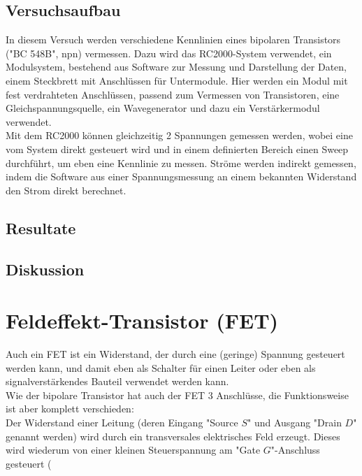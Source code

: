 \documentclass[12pt,a4paper]{article}
\begin{document}
\begin{multicols}{2}
\subsection{Versuchsaufbau}

In diesem Versuch werden verschiedene Kennlinien eines bipolaren Transistors ("BC 548B", npn) vermessen. Dazu wird das RC2000-System verwendet, ein Modulsystem, bestehend aus Software zur Messung und Darstellung der Daten, einem Steckbrett mit Anschlüssen für Untermodule. Hier werden ein Modul mit fest verdrahteten Anschlüssen, passend zum Vermessen von Transistoren, eine Gleichspannungsquelle, ein Wavegenerator und dazu ein Verstärkermodul verwendet.\\
Mit dem RC2000 können gleichzeitig 2 Spannungen gemessen werden, wobei eine vom System direkt gesteuert wird und in einem definierten Bereich einen Sweep durchführt, um eben eine Kennlinie zu messen. Ströme werden indirekt gemessen, indem die Software aus einer Spannungsmessung an einem bekannten Widerstand den Strom direkt berechnet.\\





\subsection{Resultate}


\subsection{Diskussion}

\section{Feldeffekt-Transistor (FET)}

Auch ein FET ist ein Widerstand, der durch eine (geringe) Spannung gesteuert werden kann, und damit eben als Schalter für einen Leiter oder eben als signalverstärkendes Bauteil verwendet werden kann.\\
Wie der bipolare Transistor hat auch der FET 3 Anschlüsse, die Funktionsweise ist aber komplett verschieden:\\
Der Widerstand einer Leitung (deren Eingang "Source $S$" und Ausgang "Drain $D$" genannt werden) wird durch ein transversales elektrisches Feld erzeugt. Dieses wird wiederum von einer kleinen Steuerspannung am "Gate $G$"-Anschluss gesteuert (


\end{multicols}
\end{document}
